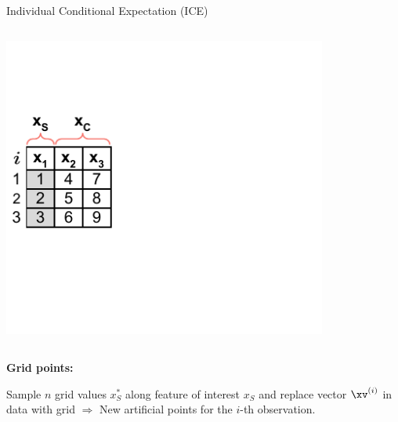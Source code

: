 \documentclass[11pt,compress,t,notes=noshow, aspectratio=169, xcolor=table]{beamer}
\begin{document}
\begin{frame}{Individual Conditional Expectation (ICE)}

\begin{columns}[T]
\begin{column}{0.4\textwidth}
\includegraphics[page=2, trim=0cm 0.35cm 0.85cm 0.35cm, width=0.9\textwidth]{figure_man/ice_plot_demo}
\end{column}
\begin{column}{0.55\textwidth}

\end{column}
\end{columns}
\vspace*{\topsep}

\textbf{Grid points:}

Sample $n$ grid values $x_S^*$ along feature of interest $x_S$
and replace vector $\xv^{(i)}$ in data with grid
\newline $\Rightarrow$ New artificial points for the $i$-th observation.

\end{frame}
\end{document}
